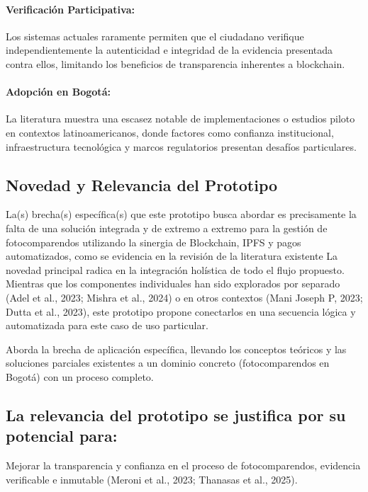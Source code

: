 \paragraph{Verificación Participativa:}
Los sistemas actuales raramente permiten que el ciudadano verifique independientemente la autenticidad e integridad de la evidencia presentada contra ellos, limitando los beneficios de transparencia inherentes a blockchain. 

\paragraph{Adopción en Bogotá:}
 La literatura muestra una escasez notable de implementaciones o estudios piloto en contextos latinoamericanos, donde factores como confianza institucional, infraestructura tecnológica y marcos regulatorios presentan desafíos particulares. \parencite{choquevilca2024blockchain, rezabala2025blockchain}

\subsection{Novedad y Relevancia del Prototipo} 
La(s) brecha(s) específica(s) que este prototipo busca abordar es precisamente la falta de una solución integrada y de extremo a extremo para la gestión de fotocomparendos utilizando la sinergia de Blockchain, IPFS y pagos automatizados, como se evidencia en la revisión de la literatura existente \parencite{yousfi2022its,AnandSingh_ProjectReport_Year}
La novedad principal radica en la integración holística de todo el flujo propuesto. Mientras que los componentes individuales han sido explorados por separado (Adel et al., 2023; Mishra et al., 2024) o en otros contextos (Mani Joseph P, 2023; Dutta et al., 2023), este prototipo propone conectarlos en una secuencia lógica y automatizada para este caso de uso particular. 

Aborda la brecha de aplicación específica, llevando los conceptos teóricos \parencite{swan2015blockchain, antonopoulos2023mastering} y las soluciones parciales existentes \parencite{choquevilca2024blockchain} a un dominio concreto (fotocomparendos en Bogotá) con un proceso completo. 

\subsection{La relevancia del prototipo se justifica por su potencial para:} 
Mejorar la transparencia y confianza en el proceso de fotocomparendos, evidencia verificable e inmutable (Meroni et al., 2023; Thanasas et al., 2025). 

